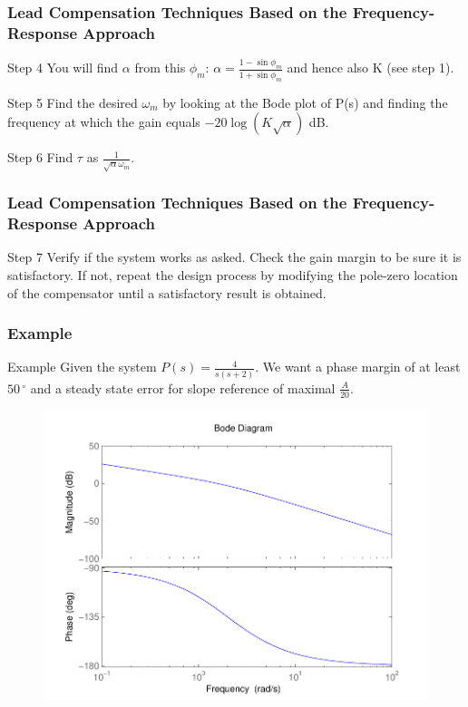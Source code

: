\begin{frame}
	\frametitle{Lead Compensation Techniques Based on the Frequency-Response Approach}
	\begin{block}{Step 4}
	You will find $\alpha$ from this $\phi_m$: $\alpha = \frac{1 - \sin \phi_m}{1 + \sin \phi_m}$ and hence also K (see step 1). 
	\end{block}
	\begin{block}{Step 5}
		Find the desired $\omega_m$ by looking at the Bode plot of P(s) and finding the frequency at which the gain equals $-20 \log (K\sqrt{\alpha})$ dB.
	\end{block}
	\begin{block}{Step 6}
	Find $\tau$ as $\frac{1}{\sqrt{\alpha}\omega_m}$.
	\end{block}
\end{frame}

\begin{frame}
	\frametitle{Lead Compensation Techniques Based on the Frequency-Response Approach}
	\begin{block}{Step 7}
		Verify if the system works as asked.
		Check the gain margin to be sure it is satisfactory. If not, repeat the design process
		by modifying the pole-zero location of the compensator until a satisfactory result
		is obtained.
	\end{block}
\end{frame}

\begin{frame}
\frametitle{Example}
\begin{block}{Example}
	Given the system $P(s) = \frac{4}{s(s+2)}$. We want a phase margin of at least $50\,^{\circ}$ and a steady state error for slope reference of maximal $\frac{A}{20}$.
	\begin{figure}
		\centering
		\includegraphics[width=0.5
		\linewidth]{bodeexamplelead}
	\end{figure}
\end{block}
\end{frame}

